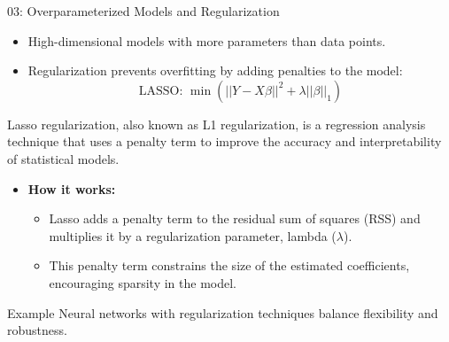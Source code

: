 \documentclass{beamer}
\begin{document}




\begin{frame}{03: Overparameterized Models and Regularization}
\begin{itemize}
    \item High-dimensional models with more parameters than data points.
    \item Regularization prevents overfitting by adding penalties to the model:
    \[
    \text{LASSO: } \min \left( ||Y - X\beta||^2 + \lambda ||\beta||_1 \right)
    \]
\end{itemize}

Lasso regularization, also known as L1 regularization, is a regression analysis technique that uses a penalty term to improve the accuracy and interpretability of statistical models.

\begin{itemize}
    \item \textbf{How it works:}
    \begin{itemize}
        \item Lasso adds a penalty term to the residual sum of squares (RSS) and multiplies it by a regularization parameter, lambda (\(\lambda\)).
        \item This penalty term constrains the size of the estimated coefficients, encouraging sparsity in the model.
    \end{itemize}
\end{itemize}

\begin{block}{Example}
Neural networks with regularization techniques balance flexibility and robustness.
\end{block}
\end{frame}
\end{document}
